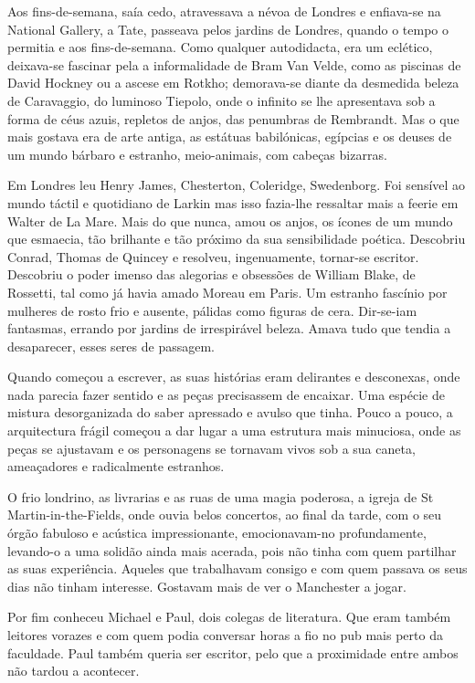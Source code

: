 Aos fins-de-semana, saía cedo, atravessava a névoa de Londres e
enfiava-se na National Gallery, a Tate, passeava pelos jardins de
Londres, quando o tempo o permitia e aos fins-de-semana. Como qualquer
autodidacta, era um eclético, deixava-se fascinar pela a informalidade
de Bram Van Velde, como as piscinas de David Hockney ou a ascese em
Rotkho; demorava-se diante da desmedida beleza de Caravaggio, do
luminoso Tiepolo, onde o infinito se lhe apresentava sob a forma de céus
azuis, repletos de anjos, das penumbras de Rembrandt. Mas o que mais
gostava era de arte antiga, as estátuas babilónicas, egípcias e os
deuses de um mundo bárbaro e estranho, meio-animais, com cabeças
bizarras.

Em Londres leu Henry James, Chesterton, Coleridge, Swedenborg. Foi
sensível ao mundo táctil e quotidiano de Larkin mas isso fazia-lhe
ressaltar mais a feerie em Walter de La Mare. Mais do que nunca, amou os
anjos, os ícones de um mundo que esmaecia, tão brilhante e tão próximo
da sua sensibilidade poética. Descobriu Conrad, Thomas de Quincey e
resolveu, ingenuamente, tornar-se escritor. Descobriu o poder imenso das
alegorias e obsessões de William Blake, de Rossetti, tal como já havia
amado Moreau em Paris. Um estranho fascínio por mulheres de rosto frio e
ausente, pálidas como figuras de cera. Dir-se-iam fantasmas, errando por
jardins de irrespirável beleza. Amava tudo que tendia a desaparecer,
esses seres de passagem.

Quando começou a escrever, as suas histórias eram delirantes e
desconexas, onde nada parecia fazer sentido e as peças precisassem de
encaixar. Uma espécie de mistura desorganizada do saber apressado e
avulso que tinha. Pouco a pouco, a arquitectura frágil começou a dar
lugar a uma estrutura mais minuciosa, onde as peças se ajustavam e os
personagens se tornavam vivos sob a sua caneta, ameaçadores e
radicalmente estranhos.

O frio londrino, as livrarias e as ruas de uma magia poderosa, a igreja
de St Martin-in-the-Fields, onde ouvia belos concertos, ao final da
tarde, com o seu órgão fabuloso e acústica impressionante,
emocionavam-no profundamente, levando-o a uma solidão ainda mais
acerada, pois não tinha com quem partilhar as suas experiência. Aqueles
que trabalhavam consigo e com quem passava os seus dias não tinham
interesse. Gostavam mais de ver o Manchester a jogar.

Por fim conheceu Michael e Paul, dois colegas de literatura. Que eram
também leitores vorazes e com quem podia conversar horas a fio no pub
mais perto da faculdade. Paul também queria ser escritor, pelo que a
proximidade entre ambos não tardou a acontecer.

